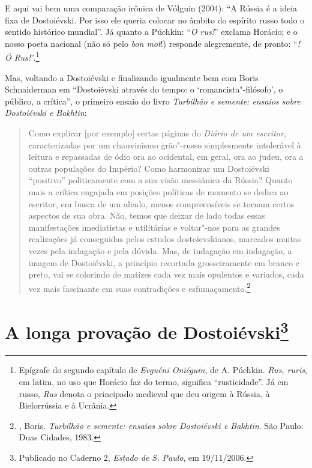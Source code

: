 E aqui vai bem uma comparação irônica de Vólguin (2004): ``A
Rússia é a ideia fixa de Dostoiévski. Por isso ele queria colocar no
âmbito do espírito russo todo o sentido histórico mundial''.
Já quanto a Púchkin: ``\emph{O rus!}'' exclama Horácio; e o nosso poeta nacional (não só pelo \emph{bon mot}!) responde alegremente, de pronto: ``\emph{{}! Ó Rus!}''.\footnote{Epígrafe do segundo capítulo de \emph{Evguéni Oniéguin}, de A. Púchkin. \emph{Rus, ruris}, em latim, no uso que Horácio faz do termo, significa ``rusticidade''. Já em russo, \emph{Rus} denota o principado medieval que deu origem à Rússia, à Bielorrússia e à Ucrânia.}

Mas, voltando a Dostoiévski e finalizando igualmente bem com Boris
Schnaiderman em ``Dostoiévski através do tempo: o
`romancista"-filósofo', o público, a crítica'', o primeiro
ensaio do livro \emph{Turbilhão e semente: ensaios sobre
Dostoiévski e Bakhtin}:

\begin{quotation}
Como explicar [por exemplo] certas páginas do \emph{Diário de um escritor}, caracterizadas por um chauvinismo grão"-russo simplesmente intolerável à leitura e repassadas de ódio ora ao ocidental, em geral, ora ao judeu, ora a outras populações do Império? Como harmonizar um Dostoiévski ``positivo'' politicamente com a sua visão messiânica da Rússia? Quanto mais a crítica engajada em posições políticas de momento se dedica ao escritor, em busca de um aliado, menos compreensíveis se tornam certos aspectos de sua obra. Não, temos que deixar de lado todas essas manifestações imediatistas e utilitárias e voltar"-nos para as grandes realizações já conseguidas pelos estudos dostoievskianos, marcados muitas vezes pela indagação e pela dúvida. Mas, de indagação em indagação, a imagem de Dostoiévski, a princípio recortada grosseiramente em branco e preto, vai se colorindo de matizes cada vez mais opulentos e variados, cada vez mais fascinante em suas contradições e esfumaçamento.\footnote{, Boris. \emph{Turbilhão e semente: ensaios sobre Dostoiévski e Bakhtin}. São Paulo: Duas Cidades, 1983.}
\end{quotation}



\chapter*{A longa provação de Dostoiévski\footnote{Publicado no Caderno 2, \emph{Estado de S. Paulo}, em 19/11/2006.}}

